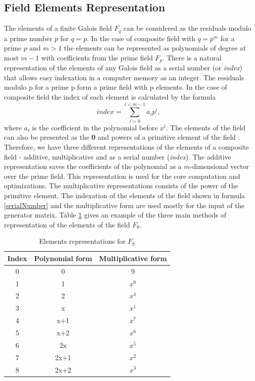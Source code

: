	\subsection{Field Elements Representation}\label{reprSection}
	The elements of a finite Galois field $F_q$ can be considered as the residuals modulo a prime number $p$ for $q=p$. In the case of composite field with $q = p^m$ for a prime $p$ and $m>1$ the elements can be represented as polynomials of degree at most $m-1$ with coefficients from the prime field $F_p$. There is a natural representation of the elements of any Galois field as a serial number (or \emph{index}) that allows easy indexation in a computer memory as an integer. The residuals modulo p for a prime p form a prime field with p elements. In the case of composite field the index of each element is calculated by the formula 
	\begin{equation}\label{serialNumber}
		index =\sum_{i=0}^{i<m-1}a_ip^i,
	\end{equation}
	 where $a_i$ is the coefficient in the polynomial before $x^i$. The elements of the field can also be presented as the \textbf{0} and powers of a primitive element of the field \cite{NiederreiterFiniteFields}. 
	 Therefore, we have three different representations of the elements of a composite field - additive, multiplicative and as a serial number (\emph{index}). The additive representation saves the coefficients of the polynomial as a $m$-dimensional vector over the prime field. This representation is used for the core computation and optimizations. The multiplicative representations consists of the power of the primitive element. The indexation of the elements of the field shown in formula \ref{serialNumber} and the multiplicative form are used mostly for the input of the generator matrix. Table \ref{elementsForms} gives an example of the three main methods of representation of the elements of the field $F_9$.
	 	\begin{table}
	 	\caption{Elements representations for $F_9$}
	 	\label{elementsForms}
	 	\begin{center}
	 		\begin{tabular}{|c|c|c|}
	 			\hline
	 			Index & Polynomial form  &  Multiplicative form\\
	 			\hline
	 			\hline
	 		 	0 & 0 & 9\\
	 			\hline
	 			1 & 1 & $x^0$\\
	 			\hline
	 			2 & 2 & $x^4$\\
	 			\hline
	 			3 & x & $x^1$\\
	 			\hline
	 			4 & x+1 & $x^7$ \\
	 			\hline
	 			5 & x+2 & $x^6$ \\
	 			\hline
	 			6 & 2x & $x^5$\\
	 			\hline
	 			7 & 2x+1 & $x^2$\\
	 			\hline
				8 & 2x+2 & $x^3$\\
				\hline
	 		\end{tabular}
	 	\end{center}
	 \end{table}
	
